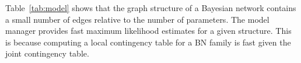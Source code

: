 Table~\ref{tab:model} shows that the graph structure of a Bayesian network contains a small number of edges relative to the number of parameters. 
The model manager provides fast maximum likelihood estimates for a given structure. 
This is because computing a local contingency table for a BN family is fast given the joint contingency table.
%

\begin{table}[htbp]
\caption{Model Manager Evaluation.}
  \centering
  \label{tab:model}%
\end{table}%


